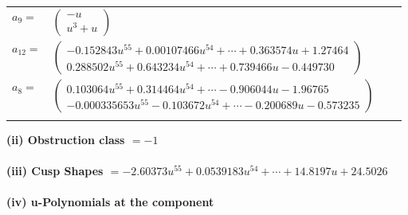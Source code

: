 \documentclass[1p]{elsarticle_modified}
\theoremstyle{definition}
\begin{document}
\begin{tabular}{m{7pt} m{180pt} m{7pt} m{180pt} }
\flushright $a_{9}=$&$\begin{pmatrix}- u\\u^3+u\end{pmatrix}$ \\
\flushright $a_{12}=$&$\begin{pmatrix}-0.152843 u^{55}+0.00107466 u^{54}+\cdots+0.363574 u+1.27464\\0.288502 u^{55}+0.643234 u^{54}+\cdots+0.739466 u-0.449730\end{pmatrix}$ \\
\flushright $a_{8}=$&$\begin{pmatrix}0.103064 u^{55}+0.314464 u^{54}+\cdots-0.906044 u-1.96765\\-0.000335653 u^{55}-0.103672 u^{54}+\cdots-0.200689 u-0.573235\end{pmatrix}$\\&\end{tabular}
\flushleft \textbf{(ii) Obstruction class $= -1$}\\~\\
\flushleft \textbf{(iii) Cusp Shapes $= -2.60373 u^{55}+0.0539183 u^{54}+\cdots+14.8197 u+24.5026$}\\~\\
\newpage\renewcommand{\arraystretch}{1}
\flushleft \textbf{(iv) u-Polynomials at the component}\newline \\
\end{document}
